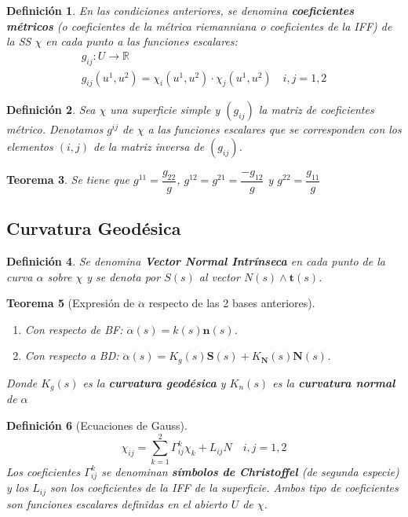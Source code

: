 \documentclass[twoside]{article}
\newtheorem{theorem}{Teorema}[section]
\newtheorem{defi}[theorem]{Definición}
\numberwithin{equation}{section}
\newcommand{\R}{\mathbb{R}}
\providecommand{\func}[2]{\colon{#1}\longrightarrow{#2}}
\begin{document}
\begin{defi} En las condiciones anteriores, se denomina \textbf{coeficientes métricos} (o coeficientes de la métrica riemanniana o coeficientes de la IFF) de la SS $\chi$ en cada punto a las funciones escalares:
\begin{gather*}
g_{ij}\func{U}{\R}\\
g_{ij}(u^1,u^2)=\chi_i(u^1,u^2)\cdot\chi_j(u^1,u^2) \quad i,j=1,2
\end{gather*}
\end{defi}
\begin{defi} Sea $\chi$ una superficie simple y $(g_{ij})$ la matriz de coeficientes métrico. Denotamos $g^{ij}$ de $\chi$ a las funciones escalares que se corresponden con los elementos $(i,j)$ de la matriz inversa de $(g_{ij})$.
\end{defi}
\begin{theorem}
Se tiene que $g^{11}=\dfrac{g_{22}}{g}$, $g^{12}=g^{21}=\dfrac{-g_{12}}{g}$ y $g^{22}=\dfrac{g_{11}}{g}$
\end{theorem}


\subsection{Curvatura Geodésica}

\begin{defi}Se denomina \textbf{Vector Normal Intrínseca} en cada punto de la curva $\alpha$ sobre $\chi$ y se denota por $S(s)$ al vector $N(s)\wedge\textbf{t}(s)$.
\end{defi}

\begin{theorem}[Expresión de $\ddot{\alpha}$ respecto de las 2 bases anteriores]\
\begin{enumerate}
\item[A] Con respecto de BF: $\ddot{\alpha}(s)=k(s)\textbf{n}(s)$.
\item[B] Con respecto a BD: $\ddot{\alpha}(s)=K_g(s)\textbf{S}(s)+K_\textbf{N}(s)\textbf{N}(s)$. 
\end{enumerate}
Donde $K_g(s)$ es la \textbf{curvatura geodésica} y $K_n(s)$ es la \textbf{curvatura normal} de $\alpha$
\end{theorem}

\begin{defi}[Ecuaciones de Gauss] 
\begin{equation*}
\chi_{ij}=\sum_{k=1}^2\Gamma_{ij}^k\chi_k+L_{ij}N\quad i,j=1,2
\end{equation*}
Los coeficientes $\Gamma_{ij}^k$ se denominan \textbf{símbolos de Christoffel} (de segunda especie) y los $L_{ij}$ son los coeficientes de la IFF de la superficie. Ambos tipo de coeficientes son funciones escalares definidas en el abierto $U$ de $\chi$.
\end{defi}
\end{document}
